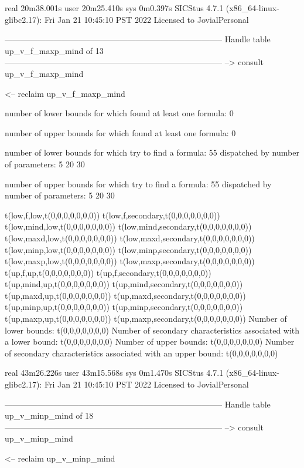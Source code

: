 real	20m38.001s
user	20m25.410s
sys	0m0.397s
SICStus 4.7.1 (x86_64-linux-glibc2.17): Fri Jan 21 10:45:10 PST 2022
Licensed to JovialPersonal


--------------------------------------------------------------------------------
Handle table up_v_f_maxp_mind of 13
--------------------------------------------------------------------------------
--> consult up_v_f_maxp_mind

<-- reclaim up_v_f_maxp_mind

number of lower bounds for which found at least one formula: 0

number of upper bounds for which found at least one formula: 0

number of lower bounds for which try to find a formula: 55
dispatched by number of parameters: 5  20  30

number of upper bounds for which try to find a formula: 55
dispatched by number of parameters: 5  20  30

t(low,f,low,t(0,0,0,0,0,0,0))
t(low,f,secondary,t(0,0,0,0,0,0,0))
t(low,mind,low,t(0,0,0,0,0,0,0))
t(low,mind,secondary,t(0,0,0,0,0,0,0))
t(low,maxd,low,t(0,0,0,0,0,0,0))
t(low,maxd,secondary,t(0,0,0,0,0,0,0))
t(low,minp,low,t(0,0,0,0,0,0,0))
t(low,minp,secondary,t(0,0,0,0,0,0,0))
t(low,maxp,low,t(0,0,0,0,0,0,0))
t(low,maxp,secondary,t(0,0,0,0,0,0,0))
t(up,f,up,t(0,0,0,0,0,0,0))
t(up,f,secondary,t(0,0,0,0,0,0,0))
t(up,mind,up,t(0,0,0,0,0,0,0))
t(up,mind,secondary,t(0,0,0,0,0,0,0))
t(up,maxd,up,t(0,0,0,0,0,0,0))
t(up,maxd,secondary,t(0,0,0,0,0,0,0))
t(up,minp,up,t(0,0,0,0,0,0,0))
t(up,minp,secondary,t(0,0,0,0,0,0,0))
t(up,maxp,up,t(0,0,0,0,0,0,0))
t(up,maxp,secondary,t(0,0,0,0,0,0,0))
Number of lower bounds:                                             t(0,0,0,0,0,0,0)
Number of secondary characteristics associated with a lower bound:  t(0,0,0,0,0,0,0)
Number of upper bounds:                                             t(0,0,0,0,0,0,0)
Number of secondary characteristics associated with an upper bound: t(0,0,0,0,0,0,0)

real	43m26.226s
user	43m15.568s
sys	0m1.470s
SICStus 4.7.1 (x86_64-linux-glibc2.17): Fri Jan 21 10:45:10 PST 2022
Licensed to JovialPersonal


--------------------------------------------------------------------------------
Handle table up_v_minp_mind of 18
--------------------------------------------------------------------------------
--> consult up_v_minp_mind

<-- reclaim up_v_minp_mind

